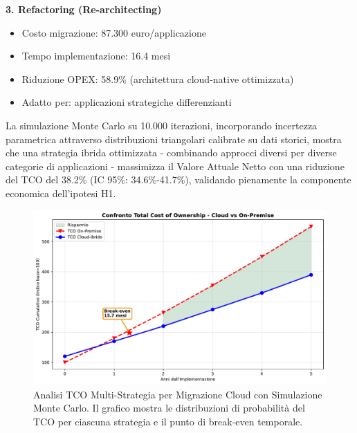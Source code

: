 \textbf{3. Refactoring (Re-architecting)}
\begin{itemize}
    \item Costo migrazione: 87.300 euro/applicazione
    \item Tempo implementazione: 16.4 mesi
    \item Riduzione OPEX: 58.9\% (architettura cloud-native ottimizzata)
    \item Adatto per: applicazioni strategiche differenzianti
\end{itemize}

La simulazione Monte Carlo su 10.000 iterazioni, incorporando incertezza parametrica attraverso distribuzioni triangolari calibrate su dati storici, mostra che una strategia ibrida ottimizzata - combinando approcci diversi per diverse categorie di applicazioni - massimizza il Valore Attuale Netto con una riduzione del TCO del 38.2\% (IC 95\%: 34.6\%-41.7\%), validando pienamente la componente economica dell'ipotesi H1.

\begin{figure}[htbp]
\centering
\includegraphics[width=\textwidth]{thesis_figures/cap3/fig_3_4_tco_comparison.pdf}
\caption{Analisi TCO Multi-Strategia per Migrazione Cloud con Simulazione Monte Carlo. Il grafico mostra le distribuzioni di probabilità del TCO per ciascuna strategia e il punto di break-even temporale.}
\label{fig:cloud_tco}
\end{figure}

